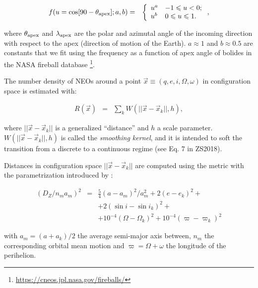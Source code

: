 \documentclass[fleqn,usenatbib]{mnras}
\newcommand{\sub}[1]{_{\rm #1}}
\newcommand{\beq}{\begin{equation}}
\newcommand{\eeq}{\end{equation}}
\newcommand{\hll}[1]{#1}
\begin{document}
\begin{eqnarray}
f(u=\cos[90-\theta\sub{apex}];a,b)&=&
\left\{
\begin{array}{ll}
u^a & -1\leq u < 0; \\
u^b & 0\leq u \leq 1.
\end{array}
\right., 
\label{eq:Flux}
\end{eqnarray}

where $\theta_{\rm apex}$ and $\lambda_{\rm apex}$ are the polar and azimutal angle of the incoming direction with respect to the apex (direction of motion of the Earth). $a\approx 1$ and $b\approx 0.5$ are constants that we fit using the frequency as a function of apex angle of bolides in the NASA fireball database \footnote{\url{https://cneos.jpl.nasa.gov/fireballs/}}.

The number density of NEOs around a point $\vec{x}\equiv(q,e,i,\Omega,\omega)$ in configuration space is estimated with:

\begin{eqnarray}
R(\vec x) &=& \sum_k W(||\vec{x}-\vec{x}_k||,h),
\label{eq:SmoothingFunction}
\end{eqnarray}
 
where $||\vec{x}-\vec{x}_k||$ is a generalized ``distance'' and $h$ a scale parameter.  $W(||\vec{x}-\vec{x}_k||,h)$ is called the {\it smoothing kernel}, and it is intended to soft the transition from a discrete to a continuous regime (see Eq. 7 in ZS2018). 

Distances in configuration space $||\vec{x}-\vec{x}_k||$ are computed using the \citet{Zappala1990} metric with the parametrization introduced by \citet{Rozek2011}:

\hll{
\beq
\label{eq:Z-metric}
\begin{array}{lll}
(D_Z/n_m a_m)^2 & = &
\frac{5}{4} (a-a_m)^2/a_m^2 + 
2 (e - e_k)^2 + \\ 
&  & + 2 (\sin i - \sin i_k)^2 +\\
&  & + 
10^{-4} (\Omega - \Omega_k)^2 +
10^{-4} (\varpi - \varpi_k)^2
\end{array} 
\eeq
}

with $a_m=(a+a_k)/2$ the average semi-major axis between, $n_m$ the corresponding orbital mean motion and $\varpi=\Omega+\omega$ the longitude of the perihelion.
\end{document}
